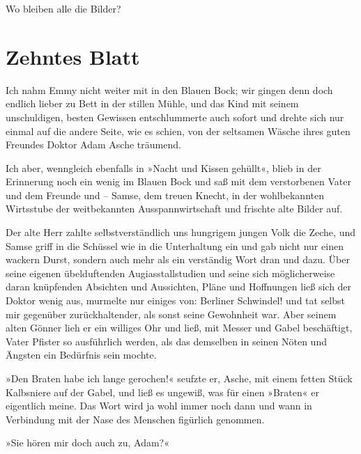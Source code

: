 Wo bleiben alle die Bilder?

\section{Zehntes Blatt}

Ich nahm Emmy nicht weiter mit in den Blauen Bock; wir gingen denn
doch endlich lieber zu Bett in der stillen Mühle, und das Kind mit
seinem unschuldigen, besten Gewissen entschlummerte auch sofort und
drehte sich nur einmal auf die andere Seite, wie es schien, von der
seltsamen Wäsche ihres guten Freundes Doktor Adam Asche träumend.

Ich aber, wenngleich ebenfalls in »Nacht und Kissen gehüllt«, blieb
in der Erinnerung noch ein wenig im Blauen Bock und saß mit dem
verstorbenen Vater und dem Freunde und – Samse, dem treuen Knecht,
in der wohlbekannten Wirtsstube der weitbekannten
Ausspannwirtschaft und frischte alte Bilder auf.

Der alte Herr zahlte selbstverständlich uns hungrigem jungen Volk
die Zeche, und Samse griff in die Schüssel wie in die Unterhaltung
ein und gab nicht nur einen wackern Durst, sondern auch mehr als
ein verständig Wort dran und dazu. Über seine eigenen übelduftenden
Augiasstallstudien und seine sich möglicherweise daran knüpfenden
Absichten und Aussichten, Pläne und Hoffnungen ließ sich der Doktor
wenig aus, murmelte nur einiges von: Berliner Schwindel! und tat
selbst mir gegenüber zurückhaltender, als sonst seine Gewohnheit
war. Aber seinem alten Gönner lieh er ein williges Ohr und ließ,
mit Messer und Gabel beschäftigt, Vater Pfister so ausführlich
werden, als das demselben in seinen Nöten und Ängsten ein Bedürfnis
sein mochte.

»Den Braten habe ich lange gerochen!« seufzte er, Asche, mit einem
fetten Stück Kalbsniere auf der Gabel, und ließ es ungewiß, was für
einen »Braten« er eigentlich meine. Das Wort wird ja wohl immer
noch dann und wann in Verbindung mit der Nase des Menschen
figürlich genommen.

»Sie hören mir doch auch zu, Adam?«


